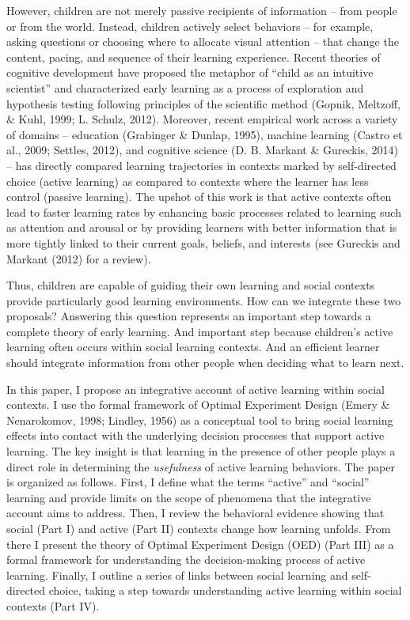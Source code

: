 \documentclass[english,floatsintext,man]{apa6}
\theoremstyle{definition}
\theoremstyle{definition}
\theoremstyle{definition}
\theoremstyle{remark}
\begin{document}
However, children are not merely passive recipients of information --
from people or from the world. Instead, children actively select
behaviors -- for example, asking questions or choosing where to allocate
visual attention -- that change the content, pacing, and sequence of
their learning experience. Recent theories of cognitive development have
proposed the metaphor of \enquote{child as an intuitive scientist} and
characterized early learning as a process of exploration and hypothesis
testing following principles of the scientific method (Gopnik, Meltzoff,
\& Kuhl, 1999; L. Schulz, 2012). Moreover, recent empirical work across
a variety of domains -- education (Grabinger \& Dunlap, 1995), machine
learning (Castro et al., 2009; Settles, 2012), and cognitive science (D.
B. Markant \& Gureckis, 2014) -- has directly compared learning
trajectories in contexts marked by self-directed choice (active
learning) as compared to contexts where the learner has less control
(passive learning). The upshot of this work is that active contexts
often lead to faster learning rates by enhancing basic processes related
to learning such as attention and arousal or by providing learners with
better information that is more tightly linked to their current goals,
beliefs, and interests (see Gureckis and Markant (2012) for a review).

Thus, children are capable of guiding their own learning and social
contexts provide particularly good learning environments. How can we
integrate these two proposals? Answering this question represents an
important step towards a complete theory of early learning. And
important step because children's active learning often occurs within
social learning contexts. And an efficient learner should integrate
information from other people when deciding what to learn next.

In this paper, I propose an integrative account of active learning
within social contexts. I use the formal framework of Optimal Experiment
Design (Emery \& Nenarokomov, 1998; Lindley, 1956) as a conceptual tool
to bring social learning effects into contact with the underlying
decision processes that support active learning. The key insight is that
learning in the presence of other people plays a direct role in
determining the \emph{usefulness} of active learning behaviors. The
paper is organized as follows. First, I define what the terms
\enquote{active} and \enquote{social} learning and provide limits on the
scope of phenomena that the integrative account aims to address. Then, I
review the behavioral evidence showing that social (Part I) and active
(Part II) contexts change how learning unfolds. From there I present the
theory of Optimal Experiment Design (OED) (Part III) as a formal
framework for understanding the decision-making process of active
learning. Finally, I outline a series of links between social learning
and self-directed choice, taking a step towards understanding active
learning within social contexts (Part IV).
\end{document}
